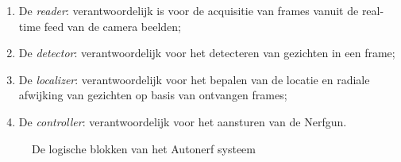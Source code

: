 \begin{enumerate}
    \item De \emph{reader}: verantwoordelijk is voor de acquisitie van
        frames vanuit de real-time feed van de camera beelden;
    \item De \emph{detector}: verantwoordelijk voor het detecteren van gezichten
        in een frame;
    \item De \emph{localizer}: verantwoordelijk voor het bepalen van de locatie
        en radiale afwijking van gezichten op basis van ontvangen frames;
    \item De \emph{controller}: verantwoordelijk voor het aansturen van de
        Nerfgun.
\end{enumerate}

\begin{figure}[H]
    \begin{center}
        
    \end{center}
    \caption{De logische blokken van het Autonerf systeem}
    \label{fig:func-architecture}
\end{figure}
